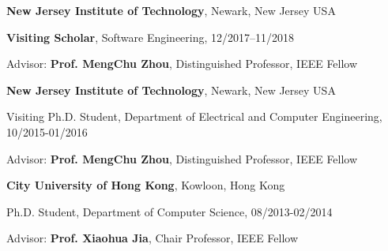 \documentclass[margin,line]{res}
\newenvironment{list1}{
\begin{list}{\ding{113}}{%
\setlength{\itemsep}{0in}
\setlength{\parsep}{0in} \setlength{\parskip}{0in}
\setlength{\topsep}{0in} \setlength{\partopsep}{0in} 
\setlength{\leftmargin}{0.17in}}}{\end{list}}
\begin{document}
\begin{resume}
{\bf New Jersey Institute of Technology}, Newark, New Jersey USA\\
\vspace*{-.1in}
\begin{list1}
\item[] \textbf{Visiting Scholar}, Software Engineering, \hfill{12/2017--11/2018}
\item[] Advisor:  \textbf{Prof. MengChu Zhou}, Distinguished Professor, IEEE Fellow
\end{list1}

{\bf New Jersey Institute of Technology}, Newark, New Jersey USA\\
\vspace*{-.1in}
\begin{list1}
\item[] Visiting Ph.D. Student, Department of Electrical and Computer Engineering, \hfill{10/2015-01/2016}
\item[] Advisor:  \textbf{Prof. MengChu Zhou}, Distinguished Professor, IEEE Fellow
\end{list1}

{\bf City University of Hong Kong}, Kowloon, Hong Kong\\
\vspace*{-.1in}
\begin{list1}
\item[] Ph.D. Student, Department of Computer Science, \hfill{08/2013-02/2014}
\item[] Advisor:  \textbf{Prof. Xiaohua Jia}, Chair Professor, IEEE Fellow
\end{list1}


\end{resume}
\end{document}
